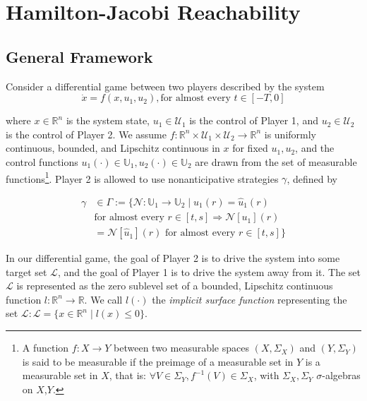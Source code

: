 \section{Hamilton-Jacobi Reachability  \label{sec:HJI}}
\subsection{General Framework}
Consider a differential game between two players described by the system
\begin{equation} \label{eq:dyn}
\dot{x} = f(x, u_1, u_2), \text{for almost every }t\in [-T,0]
\end{equation}

\noindent where $x\in\mathbb{R}^n$ is the system state, $u_1\in \mathcal{U}_1$ is the control of Player 1, and $u_2\in\mathcal{U}_2$ is the control of Player 2. We assume $f:\mathbb{R}^n\times \mathcal{U}_1 \times \mathcal{U}_2 \rightarrow \mathbb{R}^n$ is uniformly continuous, bounded, and Lipschitz continuous in $x$ for fixed $u_1,u_2$, and the control functions $u_1(\cdot)\in\mathbb{U}_1,u_2(\cdot)\in\mathbb{U}_2$ are drawn from the set of measurable functions\footnote{
A function $f:X\to Y$ between two measurable spaces $(X,\Sigma_X)$ and $(Y,\Sigma_Y)$ is said to be measurable if the preimage of a measurable set in $Y$ is a measurable set in $X$, that is: $\forall V\in\Sigma_Y, f^{-1}(V)\in\Sigma_X$, with $\Sigma_X,\Sigma_Y$ $\sigma$-algebras on $X$,$Y$.}. Player 2 is allowed to use nonanticipative strategies \cite{Evans84,Varaiya67} $\gamma$, defined by

\begin{equation}
\begin{aligned}
\gamma &\in \Gamma := \{\mathcal{N}: \mathbb{U}_1 \rightarrow \mathbb{U}_2 \mid  u_1(r) = \hat{u}_1(r) \\
&\text{for almost every } r\in[t,s] \Rightarrow \mathcal{N}[u_1](r) \\
&= \mathcal{N}[\hat{u}_1](r) \text{ for almost every } r\in[t,s]\}
\end{aligned}
\end{equation}

In our differential game, the goal of Player 2 is to drive the system into some target set $\mathcal{L}$, and the goal of Player 1 is to drive the system away from it. The set $\mathcal{L}$ is represented as the zero sublevel set of a bounded, Lipschitz continuous function $l:\mathbb{R}^n\rightarrow\mathbb{R}$. We call $l(\cdot)$ the \textit{implicit surface function} representing the set $\mathcal L: \mathcal{L}=\{x\in\mathbb{R}^n \mid l(x)\le 0\}$.

